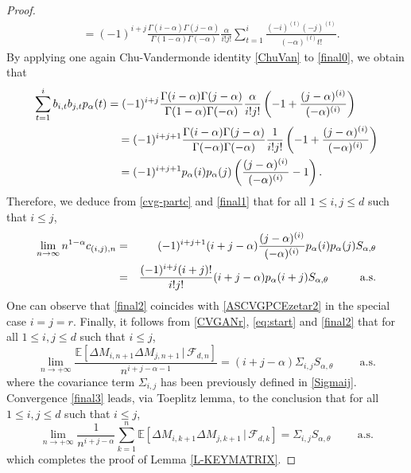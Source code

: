 \documentclass[twoside,12pt]{article}
\newcommand{\E}{\mathds{E}}
\begin{document}
\begin{proof}
\begin{align}
&=(-1)^{i+j}\frac{\Gamma(i-\alpha)\Gamma(j-\alpha)}{\Gamma(1-\alpha)\Gamma(-\alpha)}\frac{\alpha}{i!j!}\sum_{t=1}^{i}\frac{(-i)^{(t)}(-j)^{(t)}}{(-\alpha)^{(t)}t!}.
\end{align}
By applying one again Chu-Vandermonde identity \eqref{ChuVan} to \eqref{final0}, we obtain that
\begin{align}\label{final1}
\notag\sum_{t=1}^{i}b_{i,t} b_{j,t}  p_{\alpha}(t)&=(-1)^{i+j}\frac{\Gamma(i-\alpha)\Gamma(j-\alpha)}{\Gamma(1-\alpha)\Gamma(-\alpha)}\frac{\alpha}{i!j!}\left(-1+\frac{(j-\alpha)^{(i)}}{(-\alpha)^{(i)}}\right)\\
&\notag\quad=(-1)^{i+j+1}\frac{\Gamma(i-\alpha)\Gamma(j-\alpha)}{\Gamma(-\alpha)\Gamma(-\alpha)}\frac{1}{i!j!}\left(-1+\frac{(j-\alpha)^{(i)}}{(-\alpha)^{(i)}}\right)\\
&\quad=(-1)^{i+j+1}p_{\alpha}(i)p_{\alpha}(j)\left(\frac{(j-\alpha)^{(i)}}{(-\alpha)^{(i)}}-1\right).
\end{align}
Therefore, we deduce from \eqref{cvg-partc} and \eqref{final1} that for all $1\leq i,j \leq d$ such that $i \leq j$,
\begin{eqnarray}
\lim_{n \rightarrow \infty} n^{1-\alpha} c_{(i,j),n}
&=& (-1)^{i+j+1} (i+j- \alpha)\frac{(j-\alpha)^{(i)}}{(-\alpha)^{(i)}}p_{\alpha}(i)p_{\alpha}(j)S_{\alpha, \theta} \notag\\
&=&\frac{(-1)^{i+j} (i+j)!}{i!j!}(i+j- \alpha)p_\alpha(i+j)S_{\alpha,\theta}
\hspace{1cm} \text{a.s.}
\label{final2}
\end{eqnarray}
One can observe that \eqref{final2} coincides with \eqref{ASCVGPCEzetar2} in the special case $i=j=r$.
Finally, it follows from \eqref{CVGANr}, \eqref{eq:start} and \eqref{final2} that for all $1\leq i,j \leq d$ such that $i \leq j$,
\begin{equation}
\lim_{n\rightarrow+\infty} \frac{\E[\Delta M_{i,n+1}\Delta M_{j,n+1}\,|\,\mathcal{F}_{d,n}]}{n^{i+j-\alpha -1}}=
(i+j-\alpha) \Sigma_{i,j} S_{\alpha, \theta}  \hspace{1cm} \text{a.s.}
\label{final3}
\end{equation}
where the covariance term $\Sigma_{i,j}$ has been previously defined in \eqref{Sigmaij}. Convergence \eqref{final3} leads, via Toeplitz lemma, to the conclusion that for all $1\leq i,j \leq d$ such that $i \leq j$,
\begin{equation*}
\lim_{n\rightarrow+\infty}\frac{1}{n^{i+j-\alpha}} \sum_{k=1}^n
\E[\Delta M_{i,k+1}\Delta M_{j,k+1}\,|\,\mathcal{F}_{d,k}]
=\Sigma_{i,j} S_{\alpha, \theta}  \hspace{1cm} \text{a.s.}
\end{equation*}
which completes the proof of Lemma \ref{L-KEYMATRIX}.
\end{proof}
\end{document}
